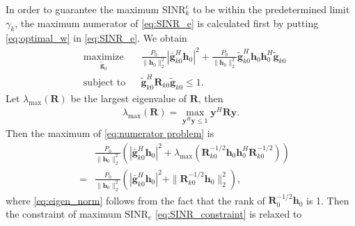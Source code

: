 \documentclass[journal]{IEEEtran}
\begin{document}
In order to guarantee the maximum $\mathrm{SINR}_k^e$ to be within the predetermined limit $\gamma_k$, the maximum numerator of \eqref{eq:SINR_e} is calculated first by putting \eqref{eq:optimal_w} in \eqref{eq:SINR_e}. We obtain
\begin{equation}
\begin{aligned} \label{eq:numerator problem}
& \underset{\tilde{\mathbf{g}}_{0}}{\text{maximize}}
& & \frac{P_0}{\|\mathbf{h}_0\|_2^2}|\bar{\mathbf{g}}_{k0}^H\mathbf{h}_0|^2 +\frac{P_0}{\|\mathbf{h}_0\|_2^2} \tilde{\mathbf{g}}_{k0}^H\mathbf{h}_0\mathbf{h}_0^H\tilde{\mathbf{g}}_{k0} \\
& \text{subject to}
& & \tilde{\mathbf{g}}_{k0}^H\mathbf{R}_{k0}\tilde{\mathbf{g}}_{k0} \leq 1.
\end{aligned}
\end{equation}
Let $\lambda_{\mathrm{max}}(\mathbf{R})$ be the largest eigenvalue of $\mathbf{R}$, then
\begin{eqnarray}
\lambda_{\mathrm{max}}(\mathbf{R})= \max_{\mathbf{y}^H\mathbf{y} \leq 1} \mathbf{y}^H\mathbf{R}\mathbf{y}.
\end{eqnarray}
Then the maximum of \eqref{eq:numerator problem} is
\begin{eqnarray}
&&\frac{P_0}{\|\mathbf{h}_0\|_2^2}\left(|\bar{\mathbf{g}}_{k0}^H\mathbf{h}_0|^2 + \lambda_{\mathrm{max}}(\mathbf{R}_{k0}^{-1/2}\mathbf{h}_0\mathbf{h}_0^H\mathbf{R}_{k0}^{-1/2})\right)\\
&=&\frac{P_0}{\|\mathbf{h}_0\|_2^2}\left(|\bar{\mathbf{g}}_{k0}^H\mathbf{h}_0|^2 + \|\mathbf{R}_{k0}^{-1/2}\mathbf{h}_0\|_2^2\right)\label{eq:eigen_norm},
\end{eqnarray} 
where \eqref{eq:eigen_norm} follows from the fact that the rank of $\mathbf{R}_0^{-1/2}\mathbf{h}_0$ is 1. Then the constraint of maximum $\mathrm{SINR}_e$ \eqref{eq:SINR_constraint}  is relaxed to
\end{document}
